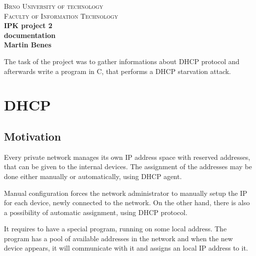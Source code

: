 \documentclass[10pt,a4paper,titlepage]{article}
\begin{document}
\begin{titlepage}

\begin{center}
\textsc{\LARGE Brno University of technology}\\[0.5cm]
\textsc{\large Faculty of Information Technology}\\[8cm]

{ \huge \bfseries IPK project 2}\\[0.3cm]
{ \Large \bfseries documentation}\\[0.5cm]
{ \bfseries Martin Benes}\\

\end{center}

\end{titlepage}
\newpage



The task of the project was to gather informations about DHCP protocol and afterwards write a program in C,
that performs a DHCP starvation attack.

\section*{DHCP}

\subsection*{Motivation}
Every private network manages its own IP address space with reserved addresses, that
can be given to the internal devices. The assignment of the addresses may be
done either manually or automatically, using DHCP agent.

Manual configuration forces the network administrator to manually setup the
IP for each device, newly connected to the network. On the other hand, there
is also a possibility of automatic assignment, using DHCP protocol.

It requires to have a special program, running on some local address. The program
has a pool of available addresses in the network and when the new device
appears, it will communicate with it and assigns an local IP address to it.
\end{document}

